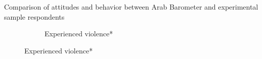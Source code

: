 \documentclass[10pt]{beamer}
\begin{document}
\begin{frame}{Comparison of attitudes and behavior between Arab Barometer and experimental sample respondents}
\begin{figure}[H]
\begin{minipage}{0.8\textwidth}
\begin{subfigure}{0.5\textwidth}
    \caption{Experienced violence*} 
    \label{} 
  \end{subfigure} 
\end{minipage}
  \label{}
\end{figure}
\end{frame}
\end{document}
